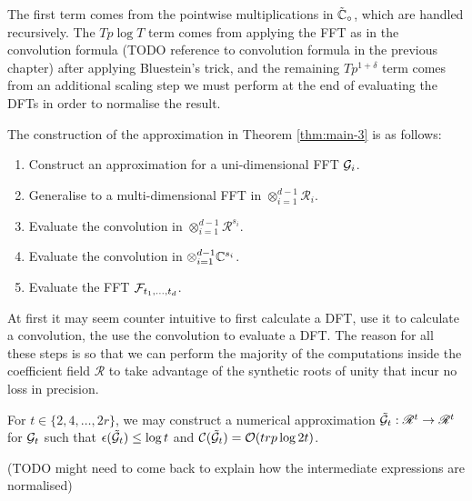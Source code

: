 The first term comes from the pointwise multiplications in $\tilde{{\mathbb C}}_\circ$, which are handled recursively. The $Tp \log T$ term comes from applying the FFT as in the convolution formula (TODO reference to convolution formula in the previous chapter) after applying Bluestein's trick, and the remaining $Tp^{1 + \delta}$ term comes from an additional scaling step we must perform at the end of evaluating the DFTs in order to normalise the result.

The construction of the approximation in Theorem \ref{thm:main-3} is as follows:
\begin{enumerate}
    \item Construct an approximation for a uni-dimensional FFT $\mathcal G_i$.
    \item Generalise to a multi-dimensional FFT in $\otimes_{i=1}^{d-1} \mathscr{R}_i$.
    \item Evaluate the convolution in $\otimes_{i=1}^{d-1} \mathscr{R}^{s_i}$.
    \item Evaluate the convolution in $\otimes_{i=1}^{d-1} {\mathbb C}^{s_i}$.
    \item Evaluate the FFT $\mathcal F_{t_1, \ldots, t_d}$.
\end{enumerate}
At first it may seem counter intuitive to first calculate a DFT, use it to calculate a convolution, the use the convolution to evaluate a DFT. The reason for all these steps is so that we can perform the majority of the computations inside the coefficient field $\mathscr{R}$ to take advantage of the synthetic roots of unity that incur no loss in precision.

\begin{lemma}
    For $t \in \{2, 4, \ldots, 2r\}$, we may construct a numerical approximation $\tilde{\mathcal G}_t: \mathscr{R}^t \to \mathscr{R}^t$ for $\mathcal G_t$ such that $\epsilon (\tilde{\mathcal G}_t) \leq \log t$ and $\mathcal C(\tilde{\mathcal G}_t)= \mathcal O(trp \log 2t)$.
\end{lemma}

(TODO might need to come back to explain how the intermediate expressions are normalised)
\medskip

